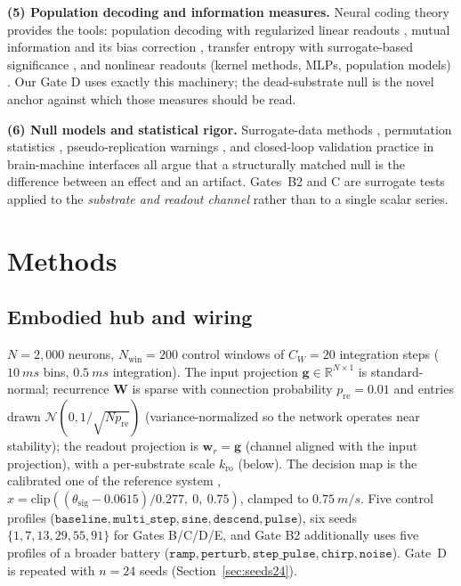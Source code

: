 \documentclass[10pt,a4paper]{article}
\begin{document}
\textbf{(5) Population decoding and information measures.} Neural
coding theory provides the tools: population decoding with regularized
linear readouts \cite{georgopoulos1986,quiroga2009,paninski2004,
hoerl1970}, mutual information and its bias correction
\cite{shannon1948,kraskov2004,panzeri2007}, transfer entropy with
surrogate-based significance \cite{schreiber2000,walker2018}, and
nonlinear readouts (kernel methods, MLPs, population models)
\cite{paninski2004,steinmetz2019}. Our Gate D uses exactly this
machinery; the dead-substrate null is the novel anchor against which
those measures should be read.

\textbf{(6) Null models and statistical rigor.} Surrogate-data methods
\cite{theiler1992}, permutation statistics \cite{ernst2004},
pseudo-replication warnings \cite{hurlbert1984}, and closed-loop
validation practice in brain-machine interfaces
\cite{carmena2003,nicolelis2003} all argue that a structurally matched
null is the difference between an effect and an artifact. Gates~B2 and
C are surrogate tests applied to the \emph{substrate and readout
channel} rather than to a single scalar series.

\section{Methods}\label{sec:methods}

\subsection{Embodied hub and wiring}\label{sec:hub}

$N=2{,}000$ neurons, $N_{\mathrm{win}}=200$ control windows of
$C_W=20$ integration steps ($\SI{10}{ms}$ bins, $\SI{0.5}{ms}$
integration). The input projection
$\mathbf{g}\in\mathbb{R}^{N\times1}$ is standard-normal;
recurrence $\mathbf{W}$ is sparse with connection probability
$p_{\mathrm{re}}=0.01$ and entries drawn
$\mathcal{N}(0,1/\sqrt{N p_{\mathrm{re}}})$ (variance-normalized so the
network operates near stability); the readout projection is
$\mathbf{w}_r=\mathbf{g}$ (channel aligned with the input projection),
with a per-substrate scale $k_{\mathrm{ro}}$ (below). The decision map
is the calibrated one of the reference system
\cite{embodied_neurocomp},
$\hat{x}=\mathrm{clip}((\theta_{\mathrm{sig}}-0.0615)/0.277,\ 0,\ 0.75)$,
clamped to $\SI{0.75}{m/s}$. Five control profiles
($\mathtt{baseline},\mathtt{multi\_step},\mathtt{sine},\mathtt{descend},
\mathtt{pulse}$), six seeds $\{1,7,13,29,55,91\}$ for Gates B/C/D/E,
and Gate B2 additionally uses five profiles of a broader battery
($\mathtt{ramp},\mathtt{perturb},\mathtt{step\_pulse},\mathtt{chirp},
\mathtt{noise}$). Gate~D is repeated with $n=24$ seeds
(Section~\ref{sec:seeds24}).
\end{document}
